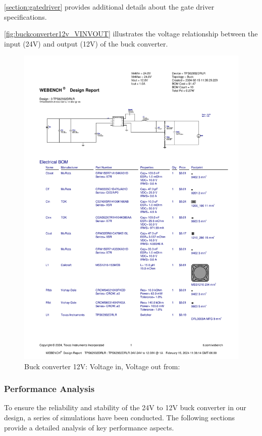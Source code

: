 \autoref{section:gatedriver} provides additional details about the gate driver specifications.

\autoref{fig:buckconverter12v_VINVOUT} illustrates the voltage relationship between the input (24V) and output (12V) of the buck converter.
\begin{figure}[H]
    \centering
    \includegraphics[trim=0 235 0 70,clip,width=0.8\linewidth,page=8]{img//buckconverters//12v/WBDesign3.pdf}
    \caption{Buck converter 12V: Voltage in, Voltage out from: %
    }
    \label{fig:buckconverter12v_VINVOUT}
\end{figure}

\subsubsection{Performance Analysis}
To ensure the reliability and stability of the 24V to 12V buck converter in our design, a series of simulations have been conducted. The following sections provide a detailed analysis of key performance aspects.

